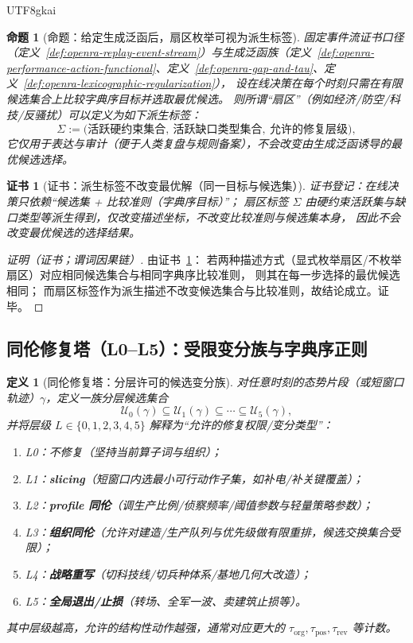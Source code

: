 \documentclass[12pt]{article}
\newtheorem{definition}{定义}[section]
\newtheorem{proposition}{命题}[section]
\newtheorem{Certificate}{证书}[section]
\begin{document}
\begin{CJK*}{UTF8}{gkai}
\begin{proposition}[命题：给定生成泛函后，扇区枚举可视为派生标签]
\label{prop:openra-sector-derived-from-functional}
固定事件流证书口径（定义~\ref{def:openra-replay-event-stream}）与生成泛函族（定义~\ref{def:openra-performance-action-functional}、定义~\ref{def:openra-gap-and-tau}、定义~\ref{def:openra-lexicographic-regularization}），
设在线决策在每个时刻只需在有限候选集合上比较字典序目标并选取最优候选。
则所谓“扇区”（例如经济/防空/科技/反骚扰）可以定义为如下派生标签：
\[
  \Sigma := \bigl(\text{活跃硬约束集合},\ \text{活跃缺口类型集合},\ \text{允许的修复层级}\bigr),
\]
它仅用于表达与审计（便于人类复盘与规则备案），不会改变由生成泛函诱导的最优候选选择。
\end{proposition}

\begin{Certificate}[证书：派生标签不改变最优解（同一目标与候选集）]
\label{cert:openra-sector-derived-from-functional}
证书登记：在线决策只依赖“候选集 + 比较准则（字典序目标）”；
扇区标签 $\Sigma$ 由硬约束活跃集与缺口类型等派生得到，仅改变描述坐标，不改变比较准则与候选集本身，
因此不会改变最优候选的选择结果。
\end{Certificate}

\begin{proof}[证明（证书；谓词因果链）]
由证书~\ref{cert:openra-sector-derived-from-functional}：
若两种描述方式（显式枚举扇区/不枚举扇区）对应相同候选集合与相同字典序比较准则，
则其在每一步选择的最优候选相同；
而扇区标签作为派生描述不改变候选集合与比较准则，故结论成立。证毕。
\end{proof}

\subsection{同伦修复塔（L0--L5）：受限变分族与字典序正则}
\label{sec:openra-repair-tower-lexicographic}

\begin{definition}[同伦修复塔：分层许可的候选变分族]
\label{def:openra-repair-tower}
对任意时刻的态势片段（或短窗口轨迹）$\gamma$，定义一族分层候选集合
\[
  \mathcal{U}_0(\gamma)\subseteq \mathcal{U}_1(\gamma)\subseteq \cdots \subseteq \mathcal{U}_5(\gamma),
\]
并将层级 $L\in\{0,1,2,3,4,5\}$ 解释为“允许的修复权限/变分类型”：
\begin{enumerate}
  \item L0：不修复（坚持当前算子词与组织）；
  \item L1：\textbf{slicing}（短窗口内选最小可行动作子集，如补电/补关键覆盖）；
  \item L2：\textbf{profile 同伦}（调生产比例/侦察频率/阈值参数与轻量策略参数）；
  \item L3：\textbf{组织同伦}（允许对建造/生产队列与优先级做有限重排，候选交换集合受限）；
  \item L4：\textbf{战略重写}（切科技线/切兵种体系/基地几何大改造）；
  \item L5：\textbf{全局退出/止损}（转场、全军一波、卖建筑止损等）。
\end{enumerate}
其中层级越高，允许的结构性动作越强，通常对应更大的 $\tau_{\mathrm{org}},\tau_{\mathrm{pos}},\tau_{\mathrm{rev}}$ 等计数。
\end{definition}


\end{CJK*}
\end{document}
